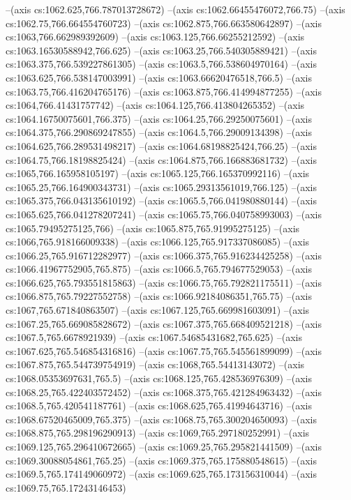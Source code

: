 --(axis cs:1062.625,766.787013728672)
--(axis cs:1062.66455476072,766.75)
--(axis cs:1062.75,766.664554760723)
--(axis cs:1062.875,766.663580642897)
--(axis cs:1063,766.662989392609)
--(axis cs:1063.125,766.66255212592)
--(axis cs:1063.16530588942,766.625)
--(axis cs:1063.25,766.540305889421)
--(axis cs:1063.375,766.539227861305)
--(axis cs:1063.5,766.538604970164)
--(axis cs:1063.625,766.538147003991)
--(axis cs:1063.66620476518,766.5)
--(axis cs:1063.75,766.416204765176)
--(axis cs:1063.875,766.414994877255)
--(axis cs:1064,766.41431757742)
--(axis cs:1064.125,766.413804265352)
--(axis cs:1064.16750075601,766.375)
--(axis cs:1064.25,766.29250075601)
--(axis cs:1064.375,766.290869247855)
--(axis cs:1064.5,766.29009134398)
--(axis cs:1064.625,766.289531498217)
--(axis cs:1064.68198825424,766.25)
--(axis cs:1064.75,766.18198825424)
--(axis cs:1064.875,766.166883681732)
--(axis cs:1065,766.165958105197)
--(axis cs:1065.125,766.165370992116)
--(axis cs:1065.25,766.164900343731)
--(axis cs:1065.29313561019,766.125)
--(axis cs:1065.375,766.043135610192)
--(axis cs:1065.5,766.041980880144)
--(axis cs:1065.625,766.041278207241)
--(axis cs:1065.75,766.040758993003)
--(axis cs:1065.79495275125,766)
--(axis cs:1065.875,765.91995275125)
--(axis cs:1066,765.918166009338)
--(axis cs:1066.125,765.917337086085)
--(axis cs:1066.25,765.916712282977)
--(axis cs:1066.375,765.916234425258)
--(axis cs:1066.41967752905,765.875)
--(axis cs:1066.5,765.794677529053)
--(axis cs:1066.625,765.793551815863)
--(axis cs:1066.75,765.792821175511)
--(axis cs:1066.875,765.79227552758)
--(axis cs:1066.92184086351,765.75)
--(axis cs:1067,765.671840863507)
--(axis cs:1067.125,765.669981603091)
--(axis cs:1067.25,765.669085828672)
--(axis cs:1067.375,765.668409521218)
--(axis cs:1067.5,765.6678921939)
--(axis cs:1067.54685431682,765.625)
--(axis cs:1067.625,765.546854316816)
--(axis cs:1067.75,765.545561899099)
--(axis cs:1067.875,765.544739754919)
--(axis cs:1068,765.54413143072)
--(axis cs:1068.05353697631,765.5)
--(axis cs:1068.125,765.428536976309)
--(axis cs:1068.25,765.422403572452)
--(axis cs:1068.375,765.421284963432)
--(axis cs:1068.5,765.420541187761)
--(axis cs:1068.625,765.41994643716)
--(axis cs:1068.67520465009,765.375)
--(axis cs:1068.75,765.300204650093)
--(axis cs:1068.875,765.298196290913)
--(axis cs:1069,765.297180252991)
--(axis cs:1069.125,765.296410672665)
--(axis cs:1069.25,765.295821441509)
--(axis cs:1069.30088054861,765.25)
--(axis cs:1069.375,765.175880548615)
--(axis cs:1069.5,765.174149060972)
--(axis cs:1069.625,765.173156310044)
--(axis cs:1069.75,765.17243146453)
